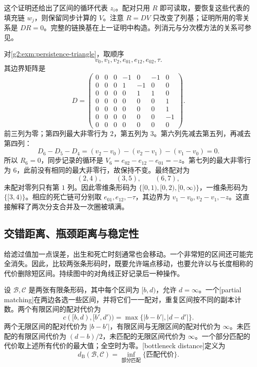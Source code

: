 这个证明还给出了区间的循环代表 \(z_i\)。配对只用 \(R\) 即可读取，要恢复这些代表的填充链 \(w_j\)，则保留同步计算的 \(V\)。注意 \(R=DV\) 只改变了列基；证明所用的零关系是 \(DR=0\)。完整的链换基在上一证明中构造。列消元与分次模方法的关系可参见\cite[第4节]{ZomorodianCarlsson2005Persistence}。

\begin{example}\label{g2:exm:persistence-triangle-reduction}
	对\cref{g2:exm:persistence-triangle}，取顺序
	\[
		v_0,v_1,v_2,e_{01},e_{12},e_{02},\tau.
	\]
	其边界矩阵是
	\[
		D=\begin{pmatrix}
			0&0&0&-1&0&-1&0\\
			0&0&0&1&-1&0&0\\
			0&0&0&0&1&1&0\\
			0&0&0&0&0&0&1\\
			0&0&0&0&0&0&1\\
			0&0&0&0&0&0&-1\\
			0&0&0&0&0&0&0
		\end{pmatrix}.
	\]
	前三列为零；第四列最大非零行为 \(2\)，第五列为 \(3\)。第六列先减去第五列，再减去第四列：
	\[
		D_6-D_5-D_4=(v_2-v_0)-(v_2-v_1)-(v_1-v_0)=0.
	\]
	所以 \(R_6=0\)，同步记录的循环是 \(V_6=e_{02}-e_{12}-e_{01}=-z\)。第七列的最大非零行为 \(6\)，此前没有相同的最大非零行，故保持不变。最终配对为
	\[
		(2,4),\qquad(3,5),\qquad(6,7),
	\]
	未配对零列只有第 \(1\) 列。因此零维条形码为 \(\{[0,1),[0,2),[0,\infty)\}\)，一维条形码为 \(\{[3,4)\}\)。相应的死亡链可分别取 \(e_{01},e_{12},-\tau\)，其边界为 \(v_1-v_0,v_2-v_1,-z\)。这直接解释了两次分支合并及一次圈被填满。
\end{example}

\subsection{交错距离、瓶颈距离与稳定性}
\label{g2:subsec:C03:04}

给滤过值加一点误差，出生和死亡时刻通常也会移动。一个非常短的区间还可能完全消失。因此，比较两张条形码时，既要允许端点移动，也要允许以与长度相称的代价删除短区间。持续图中的对角线正好记录后一种操作。

\begin{definition}\label{g2:def:barcode-bottleneck}
	设 \(\mathcal B,\mathcal C\) 是两张有限条形码，其中每个区间为 \([b,d)\)，允许 \(d=\infty\)。一个[partial matching]在两边各选一些区间，并将它们一一配对，重复区间按不同的副本计数。两个有限区间的配对代价为
	\[
		c([b,d),[b',d'))=\max\{|b-b'|,|d-d'|\}.
	\]
	两个无限区间的配对代价为 \(|b-b'|\)，有限区间与无限区间的配对代价为 \(\infty\)。未匹配的有限区间代价为 \((d-b)/2\)，未匹配的无限区间代价为 \(\infty\)。一个部分匹配的代价取上述所有代价的最大值；全空时为零。[bottleneck distance]定义为
	\[
		d_{\mathrm B}(\mathcal B,\mathcal C)=\inf_{\text{部分匹配}}\{\text{匹配代价}\}.
	\]
\end{definition}

